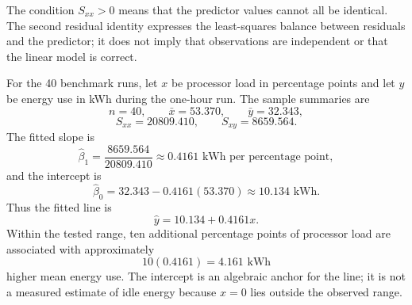 The condition $S_{xx}>0$ means that the predictor values cannot all be identical. The second residual identity expresses the least-squares balance between residuals and the predictor; it does not imply that observations are independent or that the linear model is correct.

\begin{example}\par
For the 40 benchmark runs, let $x$ be processor load in percentage points and let $y$ be energy use in kWh during the one-hour run. The sample summaries are
\[
n=40,
\qquad
\bar x=53.370,
\qquad
\bar y=32.343,
\]
\[
S_{xx}=20809.410,
\qquad
S_{xy}=8659.564.
\]
The fitted slope is
\[
\hat\beta_1
=\frac{8659.564}{20809.410}
\approx0.4161\text{ kWh per percentage point},
\]
and the intercept is
\[
\hat\beta_0
=32.343-0.4161(53.370)
\approx10.134\text{ kWh}.
\]
Thus the fitted line is
\[
\hat y=10.134+0.4161x.
\]
Within the tested range, ten additional percentage points of processor load are associated with approximately
\[
10(0.4161)=4.161\text{ kWh}
\]
higher mean energy use. The intercept is an algebraic anchor for the line; it is not a measured estimate of idle energy because $x=0$ lies outside the observed range.
\end{example}

